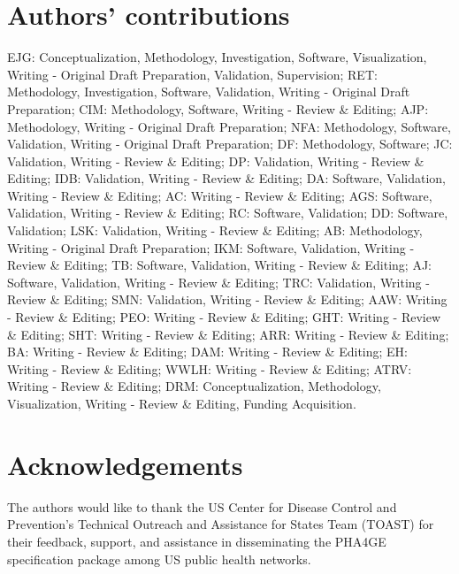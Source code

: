 \section{Authors' contributions}

EJG: Conceptualization, Methodology, Investigation, Software, Visualization, Writing - Original Draft Preparation, Validation, Supervision; RET: Methodology, Investigation, Software, Validation, Writing - Original Draft Preparation; CIM: Methodology, Software, Writing - Review \& Editing; AJP: Methodology, Writing - Original Draft Preparation; NFA: Methodology, Software, Validation, Writing - Original Draft Preparation; DF: Methodology, Software; JC: Validation, Writing - Review \& Editing; DP: Validation, Writing - Review \& Editing; IDB: Validation, Writing - Review & Editing; DA: Software, Validation, Writing - Review \& Editing; AC: Writing - Review \& Editing; AGS: Software, Validation, Writing - Review \& Editing; RC: Software, Validation; DD: Software, Validation; LSK: Validation, Writing - Review \& Editing; AB: Methodology, Writing - Original Draft Preparation; IKM: Software, Validation, Writing - Review \& Editing; TB: Software, Validation, Writing - Review \& Editing; AJ: Software, Validation, Writing - Review \& Editing; TRC: Validation, Writing - Review \& Editing; SMN: Validation, Writing - Review \& Editing; AAW: Writing - Review \& Editing; PEO: Writing - Review \& Editing; GHT: Writing - Review \& Editing; SHT: Writing - Review \& Editing; ARR: Writing - Review \& Editing; BA: Writing - Review \& Editing; DAM: Writing - Review \& Editing; EH: Writing - Review \& Editing; WWLH: Writing - Review \& Editing; ATRV: Writing - Review \& Editing; DRM: Conceptualization, Methodology, Visualization, Writing - Review \& Editing, Funding Acquisition.

\section{Acknowledgements}

The authors would like to thank the US Center for Disease Control and Prevention’s Technical Outreach and Assistance for States Team (TOAST) for their feedback, support, and assistance in disseminating the PHA4GE specification package among US public health networks.